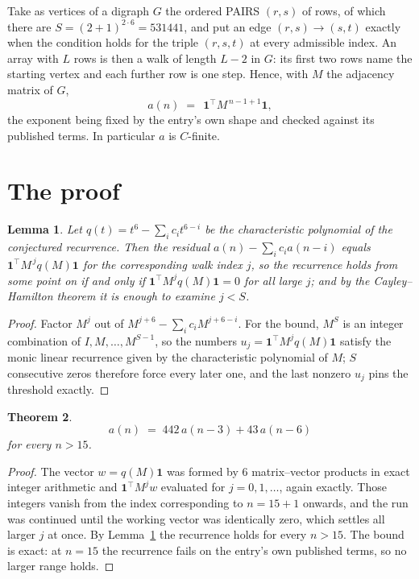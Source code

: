 \documentclass[11pt,a4paper]{article}
\theoremstyle{plain}
\newtheorem{theorem}{Theorem}
\newtheorem{lemma}[theorem]{Lemma}
\theoremstyle{definition}
\begin{document}
Take as vertices of a digraph $G$ the ordered PAIRS $(r,s)$ of rows, of which there are
$S=(2+1)^{2\cdot6}=531441$, and put an edge $(r,s)\to(s,t)$ exactly when the condition
holds for the triple $(r,s,t)$ at every admissible index. An array with $L$ rows is then a
walk of length $L-2$ in $G$: its first two rows name the starting vertex and each further
row is one step. Hence, with $M$ the adjacency matrix of $G$,
\[
a(n)\;=\;\,\mathbf{1}^{\!\top}M^{\,n-1+1}\mathbf{1},
\]
the exponent being fixed by the entry's own shape and checked against its published terms.
In particular $a$ is $C$-finite.

\section{The proof}

\begin{lemma}\label{lem:crit}
Let $q(t)=t^{6}-\sum_i c_it^{6-i}$ be the characteristic polynomial of the
conjectured recurrence. Then the residual $a(n)-\sum_ic_ia(n-i)$ equals
$\mathbf{1}^{\!\top}M^{\,j}q(M)\mathbf{1}$ for the corresponding walk index
$j$, so the recurrence holds from some point on if and only if
$\mathbf{1}^{\!\top}M^{j}q(M)\mathbf{1}=0$ for all large $j$; and by the
Cayley--Hamilton theorem it is enough to examine $j<S$.
\end{lemma}

\begin{proof}
Factor $M^{j}$ out of $M^{j+6}-\sum_ic_iM^{j+6-i}$. For the bound, $M^{S}$
is an integer combination of $I,M,\dots,M^{S-1}$, so the numbers
$u_j=\mathbf{1}^{\!\top}M^{j}q(M)\mathbf{1}$ satisfy the monic linear recurrence given by
the characteristic polynomial of $M$; $S$ consecutive zeros therefore force every later one,
and the last nonzero $u_j$ pins the threshold exactly.
\end{proof}

\begin{theorem}
\[
a(n)\;=\;442\,a(n-3) + 43\,a(n-6)
\]
for every $n>15$.
\end{theorem}

\begin{proof}
The vector $w=q(M)\mathbf{1}$ was formed by $6$ matrix--vector products in exact
integer arithmetic and $\mathbf{1}^{\!\top}M^{j}w$ evaluated for $j=0,1,\dots$, again
exactly. Those integers vanish from the index corresponding to $n=15+1$ onwards, and the
run was continued until the working vector was identically zero, which settles all larger $j$
at once. By Lemma~\ref{lem:crit} the recurrence holds for every $n>15$. The bound is exact: at $n=15$ the recurrence fails on the entry's own published terms, so no larger range holds.
\end{proof}
\end{document}
